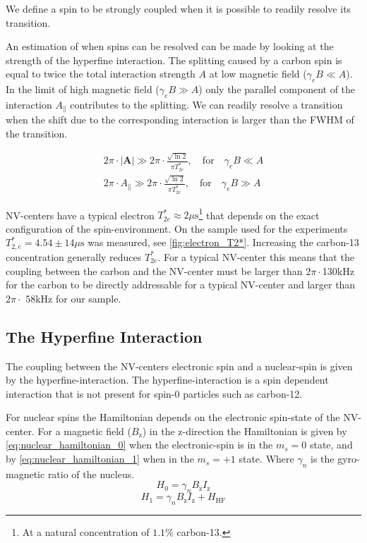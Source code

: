 We define a spin to be strongly coupled when it is possible to readily resolve its transition.

An estimation of when spins can be resolved can be made by looking at the strength of the hyperfine interaction.
The splitting caused by a carbon spin is equal to twice the total interaction strength $A$ at low magnetic field ($\gamma_e B \ll A$). In the limit of high magnetic field ($\gamma_e B \gg A$) only the parallel component of the interaction $A_\parallel$ contributes to the splitting.
We can readily resolve a transition when the shift due to the corresponding interaction is larger than the FWHM of the transition.

\begin{align}
     2\pi \cdot |\bm{A}|\gg 2\pi \cdot \frac{\sqrt{\ln{2}}}{\pi T_{2e}^*} , \quad \mathrm{for } \quad \gamma_e B \ll A  \\
     2\pi \cdot A_\parallel \gg 2\pi \cdot \frac{\sqrt{\ln{2}}}{\pi T_{2e}^*}, \quad \mathrm{for } \quad \gamma_e B \gg A
     \label{eq:def_strongly_coupled}
 \end{align}

NV-centers have a typical electron $T_{2e}^* \approx 2\mu \mathrm{s}$\footnote{At a natural concentration of $1.1 \%$ carbon-13.} that depends on the exact configuration of the spin-environment.
On the sample used for the experiments $T_{2,e}^* = 4.54 \pm 14 \mu\mathrm{s}$ was measured, see \cref{fig:electron_T2*}.
Increasing the carbon-13 concentration generally reduces $T_{2e}^*$.
For a typical NV-center this means that the coupling between the carbon and the NV-center must be larger than $2\pi\cdot$130kHz for the carbon to be directly addressable for a typical NV-center and larger than $2\pi\cdot$ 58kHz for our sample.


\subsection{The Hyperfine Interaction}
The coupling between the NV-centers electronic spin and a nuclear-spin is given by the hyperfine-interaction. The hyperfine-interaction is a spin dependent interaction that is not present for spin-0 particles such as carbon-12.

For nuclear spins the Hamiltonian depends on the electronic spin-state of the NV-center.
For a magnetic field ($B_\mathrm{z}$) in the z-direction the Hamiltonian is given by \cref{eq:nuclear_hamiltonian_0} when the electronic-spin is in the $m_s = 0$ state, and by \cref{eq:nuclear_hamiltonian_1} when in the $m_s = +1$ state\citep{Taminiau2014Universal}. Where $\gamma_n$ is the gyro-magnetic ratio of the nucleus.
 \begin{equation}
 \label{eq:nuclear_hamiltonian_0}
H_0= \gamma_{n} B_\mathrm{z} I_\mathrm{z}
\end{equation}
\begin{equation}
 \label{eq:nuclear_hamiltonian_1}
    H_1 = \gamma_{n} B_\mathrm{z} I_\mathrm{z} +H_{\mathrm{HF}}
\end{equation}

